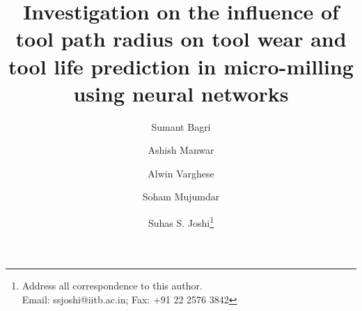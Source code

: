 \documentclass[preprint,review,12pt]{elsarticle}
\begin{document}
\graphicspath{ {C:/Users/sbagr/Desktop/DDP_home/paper/fig_p} }

\begin{frontmatter}


\title{Investigation on the influence of tool path radius on tool wear and tool life prediction in micro-milling using neural networks}


\author[1]{Sumant Bagri}
\author[2]{Ashish Manwar}
\author[3]{Alwin Varghese}
\author[4]{Soham Mujumdar}
\author[5]{Suhas S. Joshi\thanks{Address all correspondence to this author.\\Email: ssjoshi@iitb.ac.in; Fax: +91 22 2576 3842}}

\address{Department of Mechanical Engineering, Indian Institute of Technology Bombay.}


\end{frontmatter}
\end{document}
